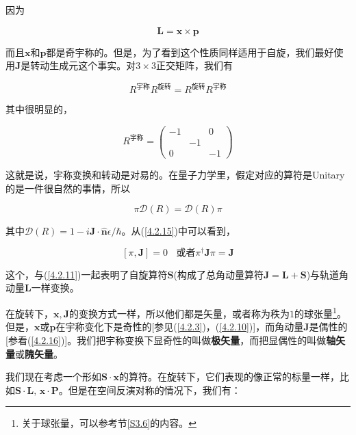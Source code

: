 \documentclass[UTF8,twoside]{ctexart}
\begin{document}
\noindent 因为

\begin{equation}
\bm{L = x\times p}
\end{equation}

\noindent 而且$\bm x$和$\bm p$都是奇宇称的。但是，为了看到这个性质同样适用于自旋，我们最好使用$\bm J$是转动生成元这个事实。对$3\times 3$正交矩阵，我们有

\begin{equation}
R^{\text{宇称}}R^{\text{旋转}} = R^{\text{旋转}}R^{\text{宇称}}
\end{equation}

\noindent 其中很明显的，

\begin{equation}
R^{\text{宇称}} = \begin{pmatrix}-1 & &0 \\  &-1 & \\ 0 & &-1 \end{pmatrix}
\end{equation}

\noindent 这就是说，宇称变换和转动是对易的。在量子力学里，假定对应的算符是Unitary的是一件很自然的事情，所以

\begin{equation} \label{4.2.15}
\pi \mathcal{D}(R) = \mathcal{D}(R) \pi
\end{equation}

\noindent 其中$\mathcal{D}(R) = 1 - i \bm{J}\cdot \hat{\bm n} \epsilon/\hbar$。从(\ref{4.2.15})中可以看到，

\begin{equation} \label{4.2.16}
\left[\pi, \bm{J}\right] = 0\ \ \ \ \text{或者} \pi^{\dagger}\bm{J}\pi = \bm{J}
\end{equation}

\noindent 这个，与(\ref{4.2.11})一起表明了自旋算符$\bm S$(构成了总角动量算符$\bm {J = L + S}$)与轨道角动量$\bm L$一样变换。

在旋转下，$\bm {x, J}$的变换方式一样，所以他们都是矢量，或者称为秩为$1$的球张量\footnote{关于球张量，可以参考节{\ref{S3.6}}的内容。}。但是，$\bm x \text{或}\bm p$在宇称变化下是奇性的[参见(\ref{4.2.3})，(\ref{4.2.10})]，而角动量$\bm J$是偶性的[参看(\ref{4.2.16})]。我们把宇称变换下显奇性的叫做{\textbf{极矢量}}，而把显偶性的叫做{\textbf{轴矢量}}或{\textbf{隗矢量}}。

我们现在考虑一个形如$\bm{S}\cdot\bm{x}$的算符。在旋转下，它们表现的像正常的标量一样，比如$\bm{S}\cdot\bm{L},\, \bm{x}\cdot\bm{P}$。但是在空间反演对称的情况下，我们有：
\end{document}
